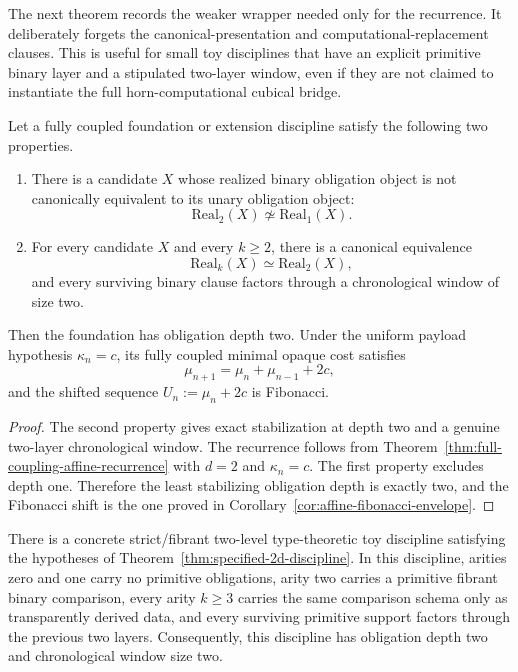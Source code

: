 The next theorem records the weaker wrapper needed only for the recurrence.  It deliberately
forgets the canonical-presentation and computational-replacement clauses.  This is useful for
small toy disciplines that have an explicit primitive binary layer and a stipulated two-layer
window, even if they are not claimed to instantiate the full horn-computational cubical bridge.

\begin{theorem}
\label{thm:specified-2d-discipline}
Let a fully coupled foundation or extension discipline satisfy the following two properties.
\begin{enumerate}
\item There is a candidate \(X\) whose realized binary obligation object is not canonically
equivalent to its unary obligation object:
\[
  \mathrm{Real}_2(X) \not\simeq \mathrm{Real}_1(X).
\]
\item For every candidate \(X\) and every \(k\geq 2\), there is a canonical equivalence
\[
  \mathrm{Real}_k(X) \simeq \mathrm{Real}_2(X),
\]
and every surviving binary clause factors through a chronological window of size two.
\end{enumerate}
Then the foundation has obligation depth two.  Under the uniform payload hypothesis
\(\kappa_n=c\), its fully coupled minimal opaque cost satisfies
\[
  \mu_{n+1}=\mu_n+\mu_{n-1}+2c,
\]
and the shifted sequence \(U_n:=\mu_n+2c\) is Fibonacci.
\end{theorem}

\begin{proof}
The second property gives exact stabilization at depth two and a genuine two-layer
chronological window.  The recurrence follows from
Theorem~\ref{thm:full-coupling-affine-recurrence} with \(d=2\) and \(\kappa_n=c\).  The
first property excludes depth one.  Therefore the least stabilizing obligation depth is exactly
two, and the Fibonacci shift is the one proved in
Corollary~\ref{cor:affine-fibonacci-envelope}.
\end{proof}

\begin{corollary}
\label{cor:concrete-2ltt-instance}
There is a concrete strict/fibrant two-level type-theoretic toy discipline satisfying the
hypotheses of Theorem~\ref{thm:specified-2d-discipline}.  In this discipline, arities zero and
one carry no primitive obligations, arity two carries a primitive fibrant binary comparison,
every arity \(k\geq 3\) carries the same comparison schema only as transparently derived data,
and every surviving primitive support factors through the previous two layers.  Consequently,
this discipline has obligation depth two and chronological window size two.
\end{corollary}

